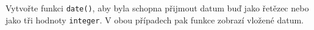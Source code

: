\begin{mdframed}[style=mdexam]
  \begin{example}\label{cpp:exam008}
    Vytvořte funkci \lstinline[style=luaCPPText]!date()!, aby byla schopna přijmout datum buď jako
    řetězec nebo jako tři hodnoty \lstinline[style=luaCPPText]!integer!. V obou případech pak funkce
    zobrazí vložené datum.
    
  \end{example}
\end{mdframed}